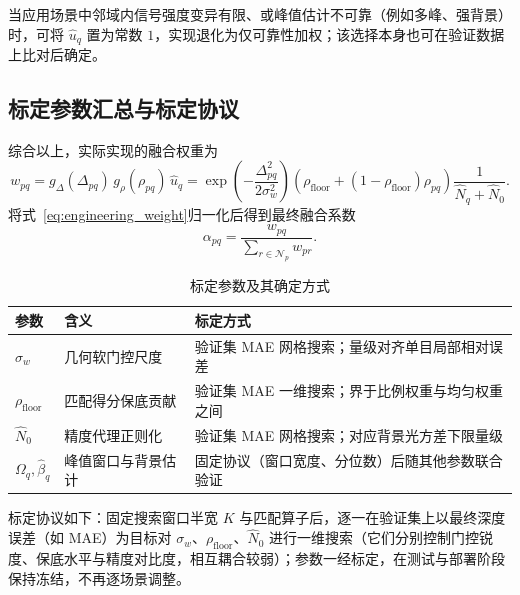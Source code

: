 \documentclass[11pt,a4paper]{ctexart}
\numberwithin{equation}{section}
\begin{document}
当应用场景中邻域内信号强度变异有限、或峰值估计不可靠（例如多峰、强背景）时，可将 $\hat u_q$ 置为常数 $1$，实现退化为仅可靠性加权；该选择本身也可在验证数据上比对后确定。

\subsection{标定参数汇总与标定协议}
\label{sec:calibration}

综合以上，实际实现的融合权重为
\begin{equation}
    \boxed{
    w_{pq}
    =
    g_{\Delta}(\Delta_{pq})\,
    g_{\rho}(\rho_{pq})\,
    \hat u_q
    =
    \exp\!\left(
    -\frac{\Delta_{pq}^{2}}
    {2\sigma_w^{2}}
    \right)
    \left(\rho_{\mathrm{floor}}
    +
    (1-\rho_{\mathrm{floor}})\rho_{pq}\right)
    \frac{1}{\hat N_q+\hat N_0}
    }.
    \label{eq:engineering_weight}
\end{equation}
将式~\eqref{eq:engineering_weight}归一化后得到最终融合系数
\begin{equation}
    \alpha_{pq}
    =
    \frac{w_{pq}}
    {\sum_{r\in\mathcal N_p}w_{pr}}.
    \label{eq:engineering_alpha}
\end{equation}

\begin{table}[htbp]
    \centering
    \caption{标定参数及其确定方式}
    \label{tab:calibration}
    \begin{tabular}{lll}
        \toprule
        参数 & 含义 & 标定方式 \\
        \midrule
        $\sigma_w$ & 几何软门控尺度 & 验证集 MAE 网格搜索；量级对齐单目局部相对误差 \\
        $\rho_{\mathrm{floor}}$ & 匹配得分保底贡献 & 验证集 MAE 一维搜索；界于比例权重与均匀权重之间 \\
        $\hat N_0$ & 精度代理正则化 & 验证集 MAE 网格搜索；对应背景光方差下限量级 \\
        $\Omega_q,\hat\beta_q$ & 峰值窗口与背景估计 & 固定协议（窗口宽度、分位数）后随其他参数联合验证 \\
        \bottomrule
    \end{tabular}
\end{table}

标定协议如下：固定搜索窗口半宽 $K$ 与匹配算子后，逐一在验证集上以最终深度误差（如 MAE）为目标对 $\sigma_w$、$\rho_{\mathrm{floor}}$、$\hat N_0$ 进行一维搜索（它们分别控制门控锐度、保底水平与精度对比度，相互耦合较弱）；参数一经标定，在测试与部署阶段保持冻结，不再逐场景调整。
\end{document}

